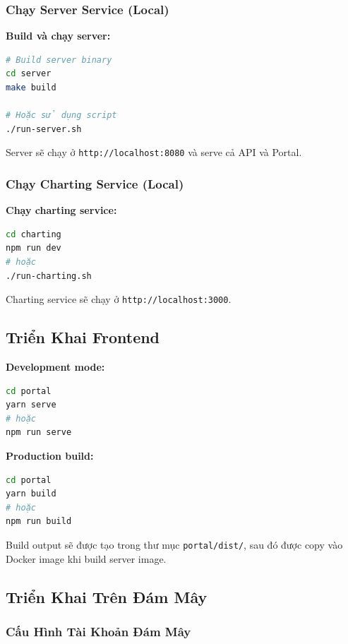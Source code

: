 \subsubsection{Chạy Server Service (Local)}

\textbf{Build và chạy server:}
\begin{lstlisting}[language=bash, caption=Build và chạy server]
# Build server binary
cd server
make build

# Hoặc sử dụng script
./run-server.sh
\end{lstlisting}

Server sẽ chạy ở \texttt{http://localhost:8080} và serve cả API và Portal.

\subsubsection{Chạy Charting Service (Local)}

\textbf{Chạy charting service:}
\begin{lstlisting}[language=bash, caption=Chạy charting service]
cd charting
npm run dev
# hoặc
./run-charting.sh
\end{lstlisting}

Charting service sẽ chạy ở \texttt{http://localhost:3000}.

\subsection{Triển Khai Frontend}

\textbf{Development mode:}
\begin{lstlisting}[language=bash, caption=Chạy Portal ở development mode]
cd portal
yarn serve
# hoặc
npm run serve
\end{lstlisting}

\textbf{Production build:}
\begin{lstlisting}[language=bash, caption=Build Portal cho production]
cd portal
yarn build
# hoặc
npm run build
\end{lstlisting}

Build output sẽ được tạo trong thư mục \texttt{portal/dist/}, sau đó được copy vào Docker image khi build server image.

\subsection{Triển Khai Trên Đám Mây}

\subsubsection{Cấu Hình Tài Khoản Đám Mây}

